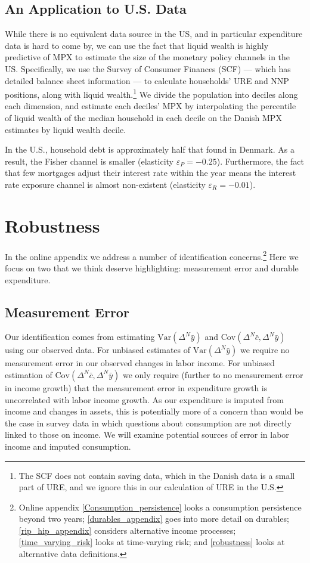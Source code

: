 \documentclass[titlepage]{\econtex}\newcommand{\texname}{ConsumptionHeterogeneity}
\begin{document}
	\subsection{An Application to U.S. Data}
	While there is no equivalent data source in the US, and in particular expenditure data is hard to come by, we can use the fact that liquid wealth is highly predictive of MPX to estimate the size of the monetary policy channels in the US. Specifically, we use the Survey of Consumer Finances (SCF) --- which has detailed balance sheet information --- to calculate households' URE and NNP positions, along with liquid wealth.\footnote{The SCF does not contain saving data, which in the Danish data is a small part of URE, and we ignore this in our calculation of URE in the U.S.} We divide the population into deciles along each dimension, and estimate each deciles' MPX by interpolating the percentile of liquid wealth of the median household in each decile on the Danish MPX estimates by liquid wealth decile.
	
	In the U.S., household debt is approximately half that found in Denmark. As a result, the Fisher channel is smaller (elasticity $\varepsilon_P = -0.25$). Furthermore, the fact that few mortgages adjust their interest rate within the year means the interest rate exposure channel is almost non-existent (elasticity $\varepsilon_R = -0.01$).
	
	\section{Robustness}
	\label{threats_to_identification}
	In the online appendix we address a number of identification concerns.\footnote{Online appendix \ref{Consumption_persistence} looks a consumption persistence beyond two years; \ref{durables_appendix} goes into more detail on durables; \ref{rip_hip_appendix} considers alternative income processes; \ref{time_varying_risk} looks at time-varying risk; and \ref{robustness} looks at alternative data definitions.} Here we focus on two that we think deserve highlighting: measurement error and durable expenditure.
	
	\subsection{Measurement Error} \label{Measurement_error}
	Our identification comes from estimating $\mathrm{Var}(\Delta^N \bar{y})$ and $\mathrm{Cov}(\Delta^N \bar{c},\Delta^N \bar{y})$ using our observed data. For unbiased estimates of $\mathrm{Var}(\Delta^N \bar{y})$ we require no measurement error in our observed changes in labor income. For unbiased estimation of $\mathrm{Cov}(\Delta^N \bar{c},\Delta^N \bar{y})$ we only require (further to no measurement error in income growth) that the measurement error in expenditure growth is uncorrelated with labor income growth. As our expenditure is imputed from income and changes in assets, this is potentially more of a concern than would be the case in survey data in which questions about consumption are not directly linked to those on income. We will examine potential sources of error in labor income and imputed consumption.
	
\end{document}
